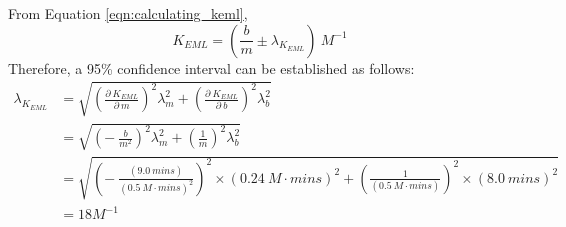 From Equation \eqref{eqn:calculating_keml},
\begin{equation*}
K_{EML}=\left (\frac{b}{m}\pm\lambda_{K_{EML}}\right ){\ }M^{-1}
\end{equation*}
Therefore, a 95\% confidence interval can be established as follows:
\begin{equation*}
\begin{split}
\lambda_{K_{EML}}&=\sqrt{\left (\frac{\partial{\ }K_{EML}}{\partial{\ }m}\right )^{2}\lambda_{m}^{2}+\left (\frac{\partial{\ }K_{EML}}{\partial{\ }b}\right )^{2}\lambda_{b}^{2}} \\
&=\sqrt{\left (-{\ }\frac{b}{m^{2}}\right )^{2}\lambda_{m}^{2}+\left (\frac{1}{m}\right )^{2}\lambda_{b}^{2}} \\
&=\sqrt{\left (-{\ }\frac{\left (9.0{\ }mins\right )}{\left (0.5{\ }M\cdot{mins}\right )^{2}}\right )^2\times\left (0.24{\ }M\cdot{mins}\right )^2+\left (\frac{1}{\left (0.5{\ }M\cdot{mins}\right )}\right )^2\times\left (8.0{\ }mins\right )^2} \\
&=18M^{-1}
 \end{split}
\end{equation*}
